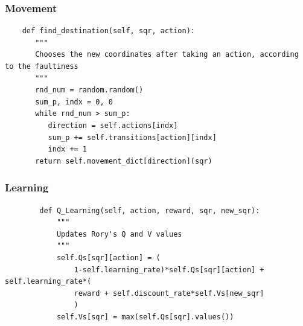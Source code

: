 \documentclass{beamer}
\begin{document}
  \begin{frame}[fragile]
	\frametitle{Movement}

	\begin{lstlisting}
	def find_destination(self, sqr, action):
	   """
	   Chooses the new coordinates after taking an action, according to the faultiness
	   """
	   rnd_num = random.random()
	   sum_p, indx = 0, 0
	   while rnd_num > sum_p:
	      direction = self.actions[indx]
	      sum_p += self.transitions[action][indx]
	      indx += 1
	   return self.movement_dict[direction](sqr)
	\end{lstlisting}
\end{frame}
  

  
  \begin{frame}[fragile]
	\frametitle{Learning}

	\begin{lstlisting}
		def Q_Learning(self, action, reward, sqr, new_sqr):
		    """
		    Updates Rory's Q and V values
		    """
		    self.Qs[sqr][action] = (
		        1-self.learning_rate)*self.Qs[sqr][action] + self.learning_rate*(
		        reward + self.discount_rate*self.Vs[new_sqr]
		        )
		    self.Vs[sqr] = max(self.Qs[sqr].values())
	\end{lstlisting}
\end{frame}
  
  
  
  
  
  
  
\end{document}
